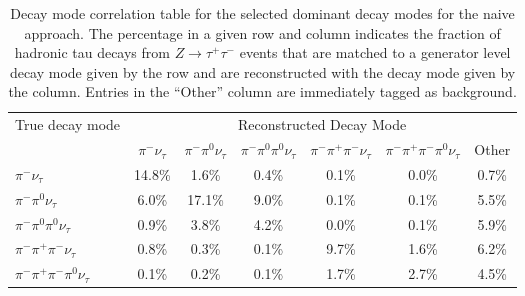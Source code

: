 
\begin{table}[htp]
   \centering
   \begin{tabular}{l|cccccc}

\multirow{2}{*}{True decay mode} & \multicolumn{6}{c}{Reconstructed Decay Mode}\\

 & $\pi^{-}\nu_\tau$ & $\pi^{-}\pi^0\nu_\tau$ & $\pi^{-}\pi^0\pi^0\nu_\tau$ & $\pi^{-}\pi^{+}\pi^{-}\nu_\tau$ & $\pi^{-}\pi^{+}\pi^{-}\pi^0\nu_\tau$& Other \\
\hline
$\pi^{-}\nu_\tau$ & 14.8\% &1.6\% &0.4\% &0.1\% &0.0\% & 0.7\% \\
$\pi^{-}\pi^0\nu_\tau$ & 6.0\% &17.1\% &9.0\% &0.1\% &0.1\% & 5.5\% \\
$\pi^{-}\pi^0\pi^0\nu_\tau$ & 0.9\% &3.8\% &4.2\% &0.0\% &0.1\% & 5.9\% \\
$\pi^{-}\pi^{+}\pi^{-}\nu_\tau$ & 0.8\% &0.3\% &0.1\% &9.7\% &1.6\% & 6.2\% \\
$\pi^{-}\pi^{+}\pi^{-}\pi^0\nu_\tau$ & 0.1\% &0.2\% &0.1\% &1.7\% &2.7\% & 4.5\% \\

\end{tabular}
\label{tab:dmResolutionNoNothing} \caption[Decay mode performance -- naive
reconstruction]{Decay mode correlation table for the selected dominant decay
modes for the naive approach.  The percentage in a given row and column
indicates the fraction of hadronic tau decays from
\mbox{$Z\to\tau^{+}\tau^{-}$} events that are matched to a generator level
decay mode given by the row and are reconstructed with the decay mode given by
the column.  Entries in the ``Other'' column are immediately tagged as background.
}
\end{table}

